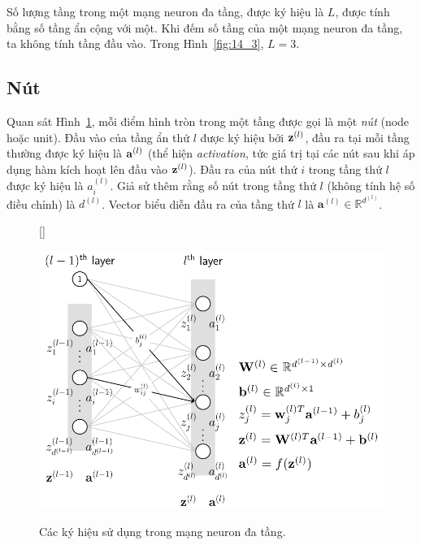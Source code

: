 Số lượng tầng trong một mạng neuron đa tầng, được ký hiệu là $L$, được
tính bằng số tầng ẩn cộng với một. Khi đếm số tầng của một
mạng neuron đa tầng, ta không tính tầng đầu vào. Trong Hình~\ref{fig:14_3}, $L = 3$.

\subsection{Nút}
Quan sát Hình~\ref{fig:14_4}, mỗi điểm hình tròn trong một tầng được
gọi là một \textit{nút} (node hoặc unit). Đầu vào của tầng ẩn thứ $l$ được ký hiệu bởi $\mathbf{z}^{(l)}$, đầu ra tại mỗi tầng thường được ký
hiệu là $\mathbf{a}^{(l)}$ (thể hiện \textit{activation}, tức giá trị tại các nút sau
khi áp dụng hàm kích hoạt lên đầu vào $\mathbf{z}^{(l)}$). Đầu ra của nút
thứ $i$ trong tầng thứ $l$ được ký hiệu là $a_i^{(l)}$. Giả sử thêm rằng số
nút trong tầng thứ $l$ (không tính hệ số điều chỉnh) là $d^{(l)}$. Vector biểu diễn đầu ra
của tầng thứ $l$ là $\mathbf{a}^{(l)} \in \mathbb{R}^{d^{(l)}}$.



\begin{figure}[t]
[\FBwidth]
{\caption{
Các ký hiệu sử dụng trong mạng neuron đa tầng.
}
\label{fig:14_4}}
{ %
\includegraphics[width=.6\textwidth]{Chapters/05_NeuralNetworks/14_mlp/latex/mlp_notation.pdf}
}
\end{figure}


